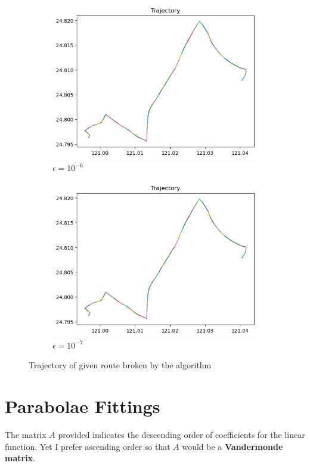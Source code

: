 \documentclass[12pt, a4paper]{article}
\begin{document}
\begin{figure}[htbp]
\begin{subfigure}{.475\linewidth}
\includegraphics[width=\linewidth]{q3_c}
\caption{$\epsilon=10^{-6}$}
\end{subfigure}
\begin{subfigure}{.475\linewidth}
\includegraphics[width=\linewidth]{q3_d}
\caption{$\epsilon=10^{-7}$}
\end{subfigure}
\caption{Trajectory of given route broken by the algorithm}
\label{fig:q3}
\end{figure}

\section{Parabolae Fittings}

The matrix $A$ provided indicates the descending order of coefficients for the linear function. Yet I prefer ascending order so that $A$ would be a \textbf{Vandermonde matrix}.
\end{document}
